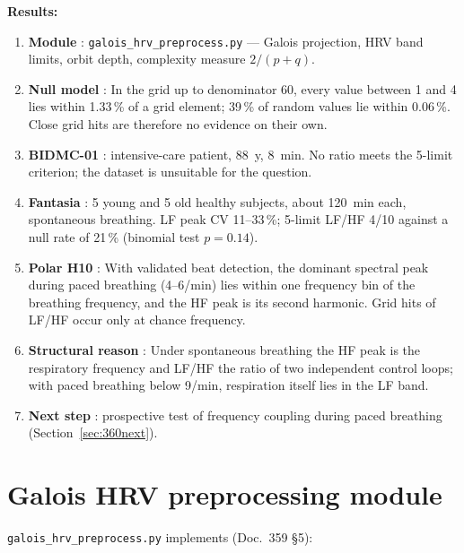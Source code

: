 \textbf{Results:}
\begin{enumerate}
\item \textbf{Module} \KM: \texttt{galois\_hrv\_preprocess.py} ---
  Galois projection, HRV band limits, orbit depth, complexity measure
  $2/(p+q)$.
\item \textbf{Null model} \KM: In the grid up to denominator 60, every
  value between 1 and 4 lies within 1.33\,\% of a grid element; 39\,\% of
  random values lie within 0.06\,\%. Close grid hits are therefore no
  evidence on their own.
\item \textbf{BIDMC-01} \LM: intensive-care patient, 88~y, 8~min. No
  ratio meets the 5-limit criterion; the dataset is unsuitable for the
  question.
\item \textbf{Fantasia} \LM: 5 young and 5 old healthy subjects, about
  120~min each, spontaneous breathing. LF peak CV 11--33\,\%; 5-limit
  LF/HF 4/10 against a null rate of 21\,\% (binomial test $p=0.14$).
\item \textbf{Polar H10} \KM: With validated beat detection, the dominant
  spectral peak during paced breathing (4--6/min) lies within one frequency
  bin of the breathing frequency, and the HF peak is its second harmonic.
  Grid hits of LF/HF occur only at chance frequency.
\item \textbf{Structural reason} \BM: Under spontaneous breathing the HF
  peak is the respiratory frequency and LF/HF the ratio of two independent
  control loops; with paced breathing below 9/min, respiration itself lies
  in the LF band.
\item \textbf{Next step} \SM: prospective test of frequency coupling
  during paced breathing (Section~\ref{sec:360next}).
\end{enumerate}

\section{Galois HRV preprocessing module}

\texttt{galois\_hrv\_preprocess.py} implements (Doc.~359 §5):


